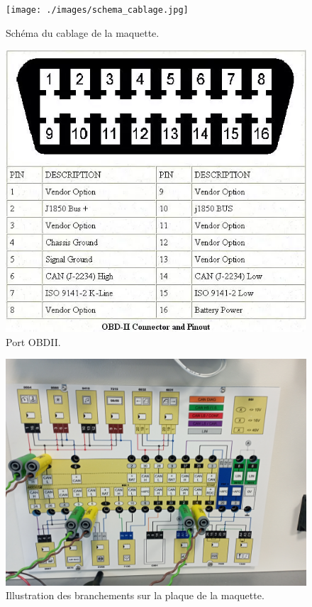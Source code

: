 \documentclass{rapportECC}
\begin{document}
\begin{figure}[H]
    \centering
    \texttt{[image: ./images/schema\_cablage.jpg]}
    \caption{Schéma du cablage de la maquette.}
    \label{fig:schema_cablage}
\end{figure}

\begin{figure}[H]
    \centering
    \includegraphics[width=.7\textwidth]{./images/OBDII_pins.png}
    \caption{Port OBDII.}
    \label{fig:Port_OBDII}
\end{figure}

\begin{figure}[H]
    \centering
    \includegraphics[width=.6\textwidth]{./images/tableau_interface.jpg}
    \caption{Illustration des branchements sur la plaque de la maquette.}
    \label{fig:tableau_interface}
\end{figure}
\end{document}
